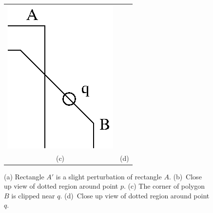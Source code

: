 \begin{figure}[t]
\begin{tabular}{cc}
\qquad
\includegraphics[width=0.4\linewidth]{images/polyBclose.eps} \\
(c) & (d)
\end{tabular}

\caption{(a) Rectangle $A'$ is a slight perturbation of rectangle $A$.
(b)~Close up view of dotted region around point $p$.
(c) The corner of polygon $B$ is clipped near $q$.
(d)~Close up view of dotted region around point $q$.}
\label{fig:rect}

\end{figure}


